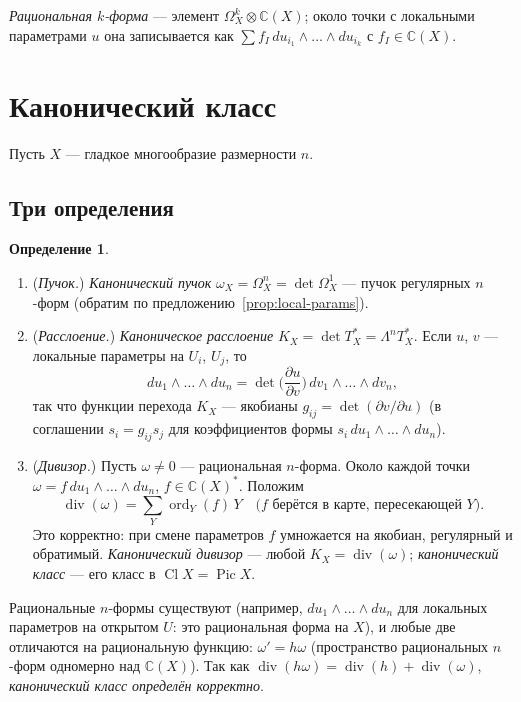 \documentclass[11pt,a4paper]{article}
\theoremstyle{plain}
\theoremstyle{definition}
\newtheorem{definition}[theorem]{Определение}
\theoremstyle{remark}
\renewcommand{\C}{\mathbb{C}}
\DeclareMathOperator{\Pic}{Pic}
\DeclareMathOperator{\Cl}{Cl}
\DeclareMathOperator{\divv}{div}
\DeclareMathOperator{\ord}{ord}
\begin{document}
\emph{Рациональная $k$-форма} --- элемент $\Omega^k_X\otimes\C(X)$; около точки с локальными
параметрами $u$ она записывается как $\sum f_I\,du_{i_1}\wedge\dots\wedge du_{i_k}$ с
$f_I\in\C(X)$.

\section{Канонический класс}\label{sec:canonical}

Пусть $X$ --- гладкое многообразие размерности $n$.

\subsection{Три определения}

\begin{definition}
\begin{enumerate}
\item (\emph{Пучок.}) \emph{Канонический пучок} $\omega_X=\Omega^n_X=\det\Omega^1_X$ --- пучок
регулярных $n$-форм (обратим по предложению~\ref{prop:local-params}).
\item (\emph{Расслоение.}) \emph{Каноническое расслоение} $K_X=\det T^*_X=\Lambda^nT^*_X$. Если
$u$, $v$ --- локальные параметры на $U_i$, $U_j$, то
\[
du_1\wedge\dots\wedge du_n=\det\Big(\frac{\partial u}{\partial v}\Big)\,dv_1\wedge\dots\wedge dv_n,
\]
так что функции перехода $K_X$ --- якобианы $g_{ij}=\det(\partial v/\partial u)$
(в соглашении $s_i=g_{ij}s_j$ для коэффициентов формы $s_i\,du_1\wedge\ldots\wedge du_n$).
\item (\emph{Дивизор.}) Пусть $\omega\neq0$ --- рациональная $n$-форма. Около каждой точки
$\omega=f\,du_1\wedge\dots\wedge du_n$, $f\in\C(X)^*$. Положим
\[
\divv(\omega)=\sum_Y\ord_Y(f)\,Y\quad\text{($f$ берётся в карте, пересекающей $Y$)}.
\]
Это корректно: при смене параметров $f$ умножается на якобиан, регулярный и обратимый.
\emph{Канонический дивизор} --- любой $K_X=\divv(\omega)$; \emph{канонический класс} --- его
класс в $\Cl X=\Pic X$.
\end{enumerate}
\end{definition}

Рациональные $n$-формы существуют (например, $du_1\wedge\dots\wedge du_n$ для локальных
параметров на открытом $U$: это рациональная форма на $X$), и любые две отличаются на
рациональную функцию: $\omega'=h\omega$ (пространство рациональных $n$-форм одномерно над
$\C(X)$). Так как $\divv(h\omega)=\divv(h)+\divv(\omega)$, \emph{канонический класс определён
корректно}.
\end{document}
